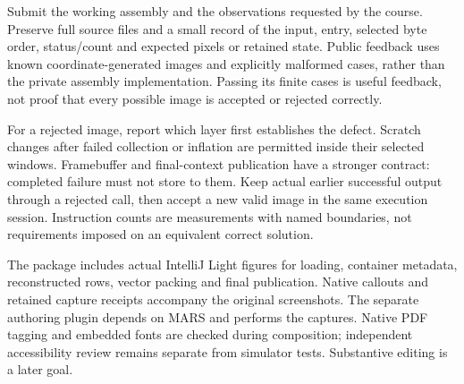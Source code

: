 Submit the working assembly and the observations requested by the course. Preserve
full source files and a small record of the input, entry, selected byte order,
status/count and expected pixels or retained state. Public feedback uses known
coordinate-generated images and explicitly malformed cases, rather than the private
assembly implementation. Passing its finite cases is useful feedback, not proof
that every possible image is accepted or rejected correctly.

For a rejected image, report which layer first establishes the defect. Scratch
changes after failed collection or inflation are permitted inside their selected
windows. Framebuffer and final-context publication have a stronger contract:
completed failure must not store to them. Keep actual earlier successful output
through a rejected call, then accept a new valid image in the same execution session.
Instruction counts are measurements with named boundaries, not requirements imposed
on an equivalent correct solution.

The package includes actual IntelliJ Light figures for loading, container metadata,
reconstructed rows, vector packing and final publication. Native callouts and
retained capture receipts accompany the original screenshots. The separate
authoring plugin depends on MARS and performs the captures. Native PDF tagging and
embedded fonts are checked during composition; independent accessibility review
remains separate from simulator tests. Substantive editing is a later goal.
